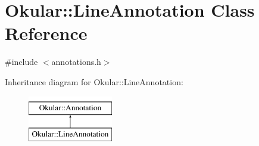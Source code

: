 \hypertarget{classOkular_1_1LineAnnotation}{\section{Okular\+:\+:Line\+Annotation Class Reference}
\label{classOkular_1_1LineAnnotation}
}


{\ttfamily \#include $<$annotations.\+h$>$}

Inheritance diagram for Okular\+:\+:Line\+Annotation\+:\begin{figure}[H]
\begin{center}
\leavevmode
\includegraphics[height=2.000000cm]{classOkular_1_1LineAnnotation}
\end{center}
\end{figure}
